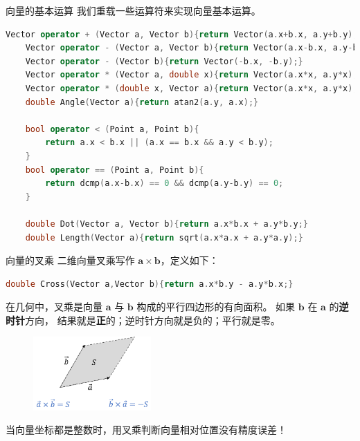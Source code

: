 \documentclass{beamer}
\begin{document}
\begin{frame}[fragile]{向量的基本运算}
    我们重载一些运算符来实现向量基本运算。
\begin{lstlisting}[language=c++]
    Vector operator + (Vector a, Vector b){return Vector(a.x+b.x, a.y+b.y);}
    Vector operator - (Vector a, Vector b){return Vector(a.x-b.x, a.y-b.y);}
    Vector operator - (Vector b){return Vector(-b.x, -b.y);}
    Vector operator * (Vector a, double x){return Vector(a.x*x, a.y*x);}
    Vector operator * (double x, Vector a){return Vector(a.x*x, a.y*x);}
    double Angle(Vector a){return atan2(a.y, a.x);}

    bool operator < (Point a, Point b){
        return a.x < b.x || (a.x == b.x && a.y < b.y);
    }
    bool operator == (Point a, Point b){
        return dcmp(a.x-b.x) == 0 && dcmp(a.y-b.y) == 0;
    }

    double Dot(Vector a, Vector b){return a.x*b.x + a.y*b.y;}
    double Length(Vector a){return sqrt(a.x*a.x + a.y*a.y);}
\end{lstlisting}
\end{frame}


\begin{frame}[fragile]{向量的叉乘}
    \small
    二维向量叉乘写作 $\mathbf{a}\times \mathbf{b}$，定义如下：
\begin{lstlisting}[language=c++]
    double Cross(Vector a,Vector b){return a.x*b.y - a.y*b.x;}
\end{lstlisting}

    \vspace{1em}\pause
    在几何中，叉乘是向量 $\mathbf{a}$ 与 $\mathbf{b}$ 构成的平行四边形的有向面积。
    如果 $\mathbf{b}$ 在 $\mathbf{a}$ 的\textbf{逆时针}方向，
    结果就是\textbf{正}的；逆时针方向就是负的；平行就是零。

    \begin{figure}
        \centering
        \includegraphics[width=0.4\textwidth]{pic/cross.png}
    \end{figure}

    \vspace{1em}\pause
    当向量坐标都是整数时，用叉乘判断向量相对位置没有精度误差！
\end{frame}
\end{document}
